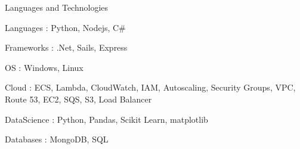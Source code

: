 

\begin{cventries}

  \cventry
    {Languages and Technologies}
    {}
    {}
    {}
    {
      \begin{cvitems} %
        \item {Languages : Python, Nodejs, C\#}
	\item {Frameworks : .Net, Sails, Express}	
	\item {OS : Windows, Linux}	
	\item {Cloud : ECS, Lambda, CloudWatch, IAM, Autoscaling, Security Groups, VPC, Route 53, EC2, SQS, S3, Load Balancer}	
	\item {DataScience : Python, Pandas, Scikit Learn, matplotlib}	
	\item {Databases : MongoDB, SQL}	
      \end{cvitems}
    }

\end{cventries}
